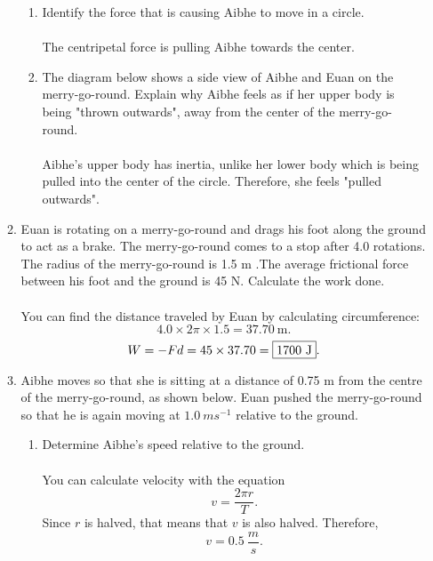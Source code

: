 \documentclass[a4paper]{report}
\begin{document}
\begin{enumerate}
\begin{enumerate}
\begin{enumerate}
                    \item Identify the force that is causing Aibhe to move in a circle. \\ \\ 
                        The centripetal force is pulling Aibhe towards the center. 
                    \item The diagram below shows a side view of Aibhe and Euan on the merry-go-round. Explain why Aibhe feels as if her upper body is being "thrown outwards", away from the center of the merry-go-round. \\ \\ 
                        Aibhe's upper body has inertia, unlike her lower body which is being pulled into the center of the circle. Therefore, she feels "pulled outwards". 
                    \end{enumerate}
                    \item Euan is rotating on a merry-go-round and drags his foot along the ground to act as a brake. The merry-go-round comes to a stop after 4.0 rotations. The radius of the merry-go-round is 1.5 m .The average frictional force between his foot and the ground is 45 N. Calculate the work done.  \\ \\ 
            You can find the distance traveled by Euan by calculating circumference:
            \[
                4.0 \times 2\pi \times 1.5 = 37.70\ \text{m}
            .\] 
            \[
                W = -Fd = 45 \times 37.70 = \fbox{1700\ J}
            .\]
        \item Aibhe moves so that she is sitting at a distance of 0.75 m from the centre of the merry-go-round, as shown below. Euan pushed the merry-go-round so that he is again moving at $1.0\ ms^{-1}$ relative to the ground. 
            \begin{enumerate}
                \item Determine Aibhe's speed relative to the ground. \\ \\ 
                    You can calculate velocity with the equation
                    \[
                    v = \frac{2\pi r}{T}
                    .\] 
                    Since $r$ is halved, that means that $v$ is also halved. Therefore, \\
                \begin{equation}                    
                    \boxed{
                    v = 0.5\ \frac{m}{s}
            .}

\end{equation}
\end{enumerate}
\end{enumerate}
\end{enumerate}
\end{document}
